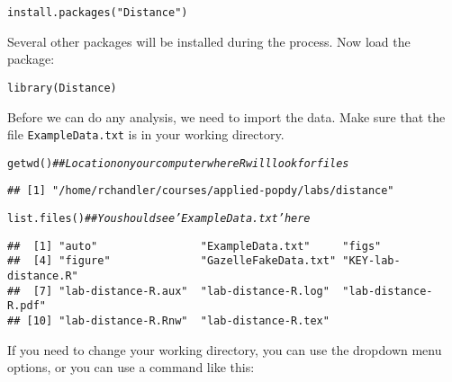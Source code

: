 \documentclass[12pt]{article}\usepackage[]{graphicx}\usepackage[]{xcolor}
\makeatletter
\newcommand{\hlstr}[1]{\textcolor[rgb]{0.749,0.012,0.012}{#1}}%
\newcommand{\hlcom}[1]{\textcolor[rgb]{0.514,0.506,0.514}{\textit{#1}}}%
\newcommand{\hlstd}[1]{\textcolor[rgb]{0,0,0}{#1}}%
\newcommand{\hlkwd}[1]{\textcolor[rgb]{0.004,0.004,0.506}{#1}}%
\newenvironment{kframe}{%
 \def\at@end@of@kframe{}%
 \ifinner\ifhmode%
  \def\at@end@of@kframe{\end{minipage}}%
  \begin{minipage}{\columnwidth}%
 \fi\fi%
 \def\FrameCommand##1{\hskip\@totalleftmargin \hskip-\fboxsep
 \colorbox{shadecolor}{##1}\hskip-\fboxsep
     \hskip-\linewidth \hskip-\@totalleftmargin \hskip\columnwidth}%
 \MakeFramed {\advance\hsize-\width
   \@totalleftmargin\z@ \linewidth\hsize
   \@setminipage}}%
 {\par\unskip\endMakeFramed%
 \at@end@of@kframe}
\newenvironment{knitrout}{}{} %
\makeatother
\begin{document}
\begin{knitrout}
\color{fgcolor}\begin{kframe}
\begin{alltt}
\hlkwd{install.packages}\hlstd{(}\hlstr{"Distance"}\hlstd{)}
\end{alltt}
\end{kframe}
\end{knitrout}

Several other packages will be installed during the process. Now
load the package: 

\begin{knitrout}
\color{fgcolor}\begin{kframe}
\begin{alltt}
\hlkwd{library}\hlstd{(Distance)}
\end{alltt}
\end{kframe}
\end{knitrout}

Before we can do any analysis, we need to import the 
data. Make sure that the file \texttt{ExampleData.txt} is in your
working directory.

\begin{knitrout}
\color{fgcolor}\begin{kframe}
\begin{alltt}
\hlkwd{getwd}\hlstd{()}       \hlcom{## Location on your computer where R will look for files}
\end{alltt}
\begin{verbatim}
## [1] "/home/rchandler/courses/applied-popdy/labs/distance"
\end{verbatim}
\begin{alltt}
\hlkwd{list.files}\hlstd{()}  \hlcom{## You should see 'ExampleData.txt' here}
\end{alltt}
\begin{verbatim}
##  [1] "auto"                "ExampleData.txt"     "figs"               
##  [4] "figure"              "GazelleFakeData.txt" "KEY-lab-distance.R" 
##  [7] "lab-distance-R.aux"  "lab-distance-R.log"  "lab-distance-R.pdf" 
## [10] "lab-distance-R.Rnw"  "lab-distance-R.tex"
\end{verbatim}
\end{kframe}
\end{knitrout}

If you need to change your working directory, you can use the dropdown
menu options, or you can use a command like this:
\end{document}
